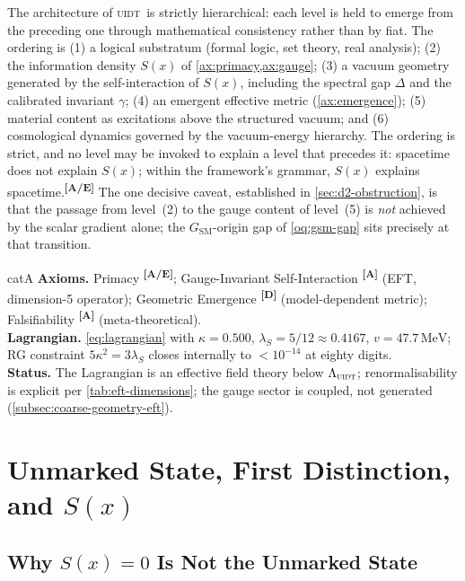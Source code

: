 \documentclass[12pt,a4paper,twoside]{article}
\theoremstyle{plain}
\theoremstyle{definition}
\theoremstyle{remark}
\newcommand{\UIDT}{\textsc{uidt}}
\newcommand{\MeV}{\,\mathrm{MeV}}
\newcommand{\catmark}[1]{\textsuperscript{\textsf{\textbf{[#1]}}}}
\newcommand{\Sx}{S(x)}
\newcommand{\lambdaS}{5/12 \approx 0.4167} %
\newcommand{\kappaVal}{0.500} %
\newcommand{\vVEV}{47.7\MeV} %
\begin{document}
The architecture of \UIDT\ is strictly hierarchical: each level is held to emerge from the preceding one through mathematical consistency rather than by fiat. The ordering is (1) a logical substratum (formal logic, set theory, real analysis); (2) the information density $\Sx$ of \cref{ax:primacy,ax:gauge}; (3) a vacuum geometry generated by the self-interaction of $\Sx$, including the spectral gap $\Delta$ and the calibrated invariant $\gamma$; (4) an emergent effective metric (\cref{ax:emergence}); (5) material content as excitations above the structured vacuum; and (6) cosmological dynamics governed by the vacuum-energy hierarchy. The ordering is strict, and no level may be invoked to explain a level that precedes it: spacetime does not explain $\Sx$; within the framework's grammar, $\Sx$ explains spacetime.\catmark{A/E} The one decisive caveat, established in \cref{sec:d2-obstruction}, is that the passage from level~(2) to the gauge content of level~(5) is \emph{not} achieved by the scalar gradient alone; the $G_{\mathrm{SM}}$-origin gap of \cref{oq:gsm-gap} sits precisely at that transition.

\begin{evidencebox}{catA}
\textbf{Axioms.} Primacy \catmark{A/E}; Gauge-Invariant Self-Interaction \catmark{A} (EFT, dimension-5 operator); Geometric Emergence \catmark{D}
(model-dependent metric); Falsifiability \catmark{A} (meta-theoretical).\\[0.3em]
\textbf{Lagrangian.} \cref{eq:lagrangian} with $\kappa=\kappaVal$, $\lambda_S=\lambdaS$, $v=\vVEV$; RG constraint $5\kappa^2=3\lambda_S$ closes
internally to $<10^{-14}$ at eighty digits.\\[0.3em]
\textbf{Status.} The Lagrangian is an effective field theory below $\Lambda_{\UIDT}$; renormalisability is explicit per \cref{tab:eft-dimensions}; the gauge sector is coupled, not generated (\cref{subsec:coarse-geometry-eft}).
\end{evidencebox}

\section{Unmarked State, First Distinction, and \texorpdfstring{$S(x)$}{S(x)}}
\label{sec:unmarked-distinction-sx}

\subsection{Why \texorpdfstring{$S(x)=0$}{S(x)=0} Is Not the Unmarked State}
\label{subsec:sx-zero-not-unmarked}
\end{document}
